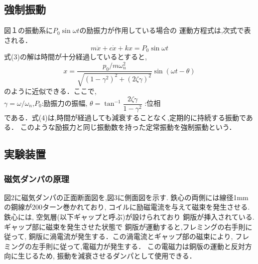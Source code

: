 \documentclass[a4paper,10.5pt]{jsarticle}
\begin{document}
\subsection{強制振動}
図１の振動系に$P_0\sin{\omega}{t}$の励振力が作用している場合の
運動方程式は,次式で表される．
\begin{equation}
  m\ddot{x}+c\dot{x}+kx = P_0\sin{\omega}{t}
\end{equation}
式(3)の解は時間が十分経過しているとすると,
\begin{equation}
  x = {\dfrac{p_0/m\omega_n^2}{\sqrt{(1-\gamma^2)^2+(2\zeta\gamma)^2}}\sin(\omega{t}-\theta)}
\end{equation}
のように近似できる．ここで,\\
\quad $\gamma=\omega/\omega_n$,$P_0$:励振力の振幅,
$\theta=\tan^{-1}{\dfrac{2\zeta\gamma}{1-\gamma^2}}$
:位相\\
である．式(4)は,時間が経過しても減衰することなく,定期的に持続する振動である．
このような励振力と同じ振動数を持った定常振動を強制振動という．

\subsection{実験装置}
\subsubsection{磁気ダンパの原理}
図2に磁気ダンパの正面断面図を,図3に側面図を示す. 
鉄心の両側には線径1mmの鋼線が200ターン巻かれており,
コイルに励磁電流を与えて磁束を発生させる. 
鉄心には, 空気層(以下ギャップと呼ぶ)が設けられており
銅版が挿入されている. ギャップ部に磁束を発生させた状態で
銅版が運動すると,フレミングの右手則に従って,
銅版に渦電流が発生する．この渦電流とギャップ部の磁束により,
フレミングの左手則に従って,電磁力が発生する．
この電磁力は銅版の運動と反対方向に生じるため,
振動を減衰させるダンパとして使用できる．
\end{document}
